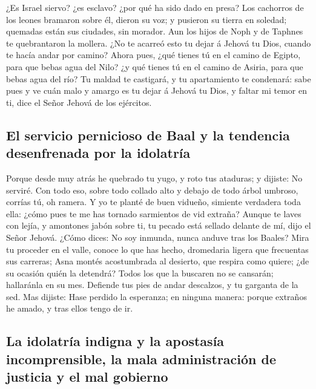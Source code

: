  ¿Es Israel siervo? ¿es esclavo? ¿por qué ha sido dado en
presa?  Los cachorros de los leones bramaron sobre él,
dieron su voz; y pusieron su tierra en soledad; quemadas están sus
ciudades, sin morador.  Aun los hijos de Noph y de
Taphnes te quebrantaron la mollera.  ¿No te acarreó esto
tu dejar á Jehová tu Dios, cuando te hacía andar por camino?
 Ahora pues, ¿qué tienes tú en el camino de Egipto, para
que bebas agua del Nilo? ¿y qué tienes tú en el camino de Asiria, para
que bebas agua del río?  Tu maldad te castigará, y tu
apartamiento te condenará: sabe pues y ve cuán malo y amargo es tu dejar
á Jehová tu Dios, y faltar mi temor en ti, dice el Señor Jehová de los
ejércitos.

\hypertarget{el-servicio-pernicioso-de-baal-y-la-tendencia-desenfrenada-por-la-idolatruxeda}{%
\subsection{El servicio pernicioso de Baal y la tendencia desenfrenada
por la
idolatría}\label{el-servicio-pernicioso-de-baal-y-la-tendencia-desenfrenada-por-la-idolatruxeda}}

 Porque desde muy atrás he quebrado tu yugo, y roto tus
ataduras; y dijiste: No serviré. Con todo eso, sobre todo collado alto y
debajo de todo árbol umbroso, corrías tú, oh ramera.  Y
yo te planté de buen vidueño, simiente verdadera toda ella: ¿cómo pues
te me has tornado sarmientos de vid extraña?  Aunque te
laves con lejía, y amontones jabón sobre ti, tu pecado está sellado
delante de mí, dijo el Señor Jehová.  ¿Cómo dices: No soy
inmunda, nunca anduve tras los Baales? Mira tu proceder en el valle,
conoce lo que has hecho, dromedaria ligera que frecuentas sus carreras;
 Asna montés acostumbrada al desierto, que respira como
quiere; ¿de su ocasión quién la detendrá? Todos los que la buscaren no
se cansarán; hallaránla en su mes.  Defiende tus pies de
andar descalzos, y tu garganta de la sed. Mas dijiste: Hase perdido la
esperanza; en ninguna manera: porque extraños he amado, y tras ellos
tengo de ir.

\hypertarget{la-idolatruxeda-indigna-y-la-apostasuxeda-incomprensible-la-mala-administraciuxf3n-de-justicia-y-el-mal-gobierno}{%
\subsection{La idolatría indigna y la apostasía incomprensible, la mala
administración de justicia y el mal
gobierno}\label{la-idolatruxeda-indigna-y-la-apostasuxeda-incomprensible-la-mala-administraciuxf3n-de-justicia-y-el-mal-gobierno}}

